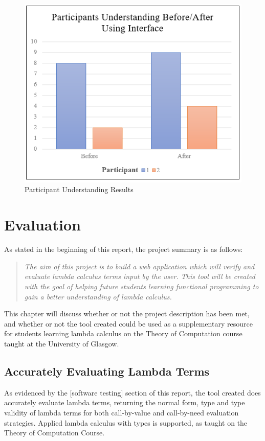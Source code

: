\documentclass[a4paper,12pt]{report}
\begin{document}
\begin{figure}[h]
	\includegraphics{images/participant_understanding}
	\centering
	\caption{Participant Understanding Results}
	\label{participant_understanding}
\end{figure}

\chapter{Evaluation}

As stated in the beginning of this report, the project summary is as follows:

\begin{quote}
	 \textit{The aim of this project is to build a web application which will verify and evaluate lambda calculus terms input by the user. This tool will be created with the goal of helping future students learning functional programming to gain a better understanding of lambda calculus.}
\end{quote}

This chapter will discuss whether or not the project description has been met, and whether or not the tool created could be used as a supplementary resource for students learning lambda calculus on the Theory of Computation course taught at the University of Glasgow.

\section{Accurately Evaluating Lambda Terms}
As evidenced by the [software testing] section of this report, the tool created does accurately evaluate lambda terms, returning the normal form, type and type validity of lambda terms for both call-by-value and call-by-need evaluation strategies. Applied lambda calculus with types is supported, as taught on the Theory of Computation Course.\\
\end{document}
